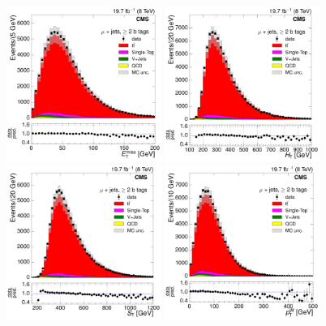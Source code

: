 \begin{figure}[hbtp]
    \centering
     \includegraphics[width=0.45\textwidth]{Chapters/07_08_09_Analysis/Images/control_plots/before_fit/8TeV/MuPlusJets_patType1CorrectedPFMet_2orMoreBtags_with_ratio}\hfill
     \includegraphics[width=0.45\textwidth]{Chapters/07_08_09_Analysis/Images/control_plots/before_fit/8TeV/MuPlusJets_HT_2orMoreBtags_with_ratio}\\
     \includegraphics[width=0.45\textwidth]{Chapters/07_08_09_Analysis/Images/control_plots/before_fit/8TeV/MuPlusJets_patType1CorrectedPFMet_ST_2orMoreBtags_with_ratio}\hfill
     \includegraphics[width=0.45\textwidth]{Chapters/07_08_09_Analysis/Images/control_plots/before_fit/8TeV/MuPlusJets_patType1CorrectedPFMet_WPT_2orMoreBtags_with_ratio}\\

\end{figure}
